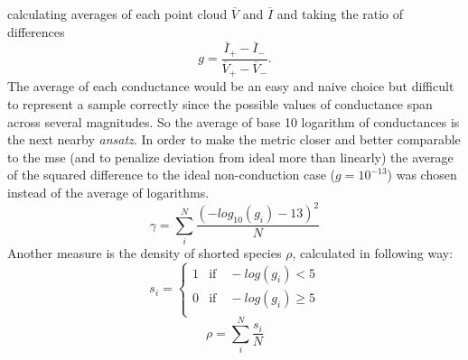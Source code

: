 calculating averages of each point cloud $\overline{V}$ and $\overline{I}$ and taking the ratio of differences 
\begin{equation}
    g = \frac{\overline{I}_{+} - \overline{I}_-}{\overline{V}_{+} - \overline{V}_-}.
\end{equation}
%
The average of each conductance would be an easy and naive choice but difficult to represent a 
sample correctly since the possible values of conductance span across several magnitudes.
So the average of base 10 logarithm of conductances is the next nearby \textit{ansatz}.
%
In order to make the metric closer and better comparable to the \gls{mse} (and to penalize deviation from ideal more than linearly) the average of the squared difference 
to the ideal non-conduction case ($g=10^{-13}$) was chosen instead of the average of logarithms. 
%
\begin{equation}
    \gamma = \sum_i^N \frac{ (-log_{10}(g_i) - 13)^2}{N}
	\label{eq:gamma}
\end{equation}
Another measure is the density of shorted species $\rho$, calculated in following way:
\begin{equation}
	s_i = \begin{cases}
	1 &\text{if} \quad -log(g_i) < 5 \\
	0 &\text{if} \quad -log(g_i) \geq 5 \\
	\end{cases}
\end{equation}
\begin{equation}
	\rho = \sum_i^N \frac{s_i}{N}
	\label{eq:rho}
\end{equation}
%


